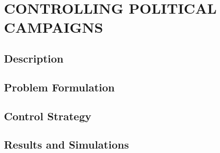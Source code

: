 \chapter{CONTROLLING POLITICAL CAMPAIGNS}

\section{Description}

\section{Problem Formulation}

\section{Control Strategy}

\section{Results and Simulations}